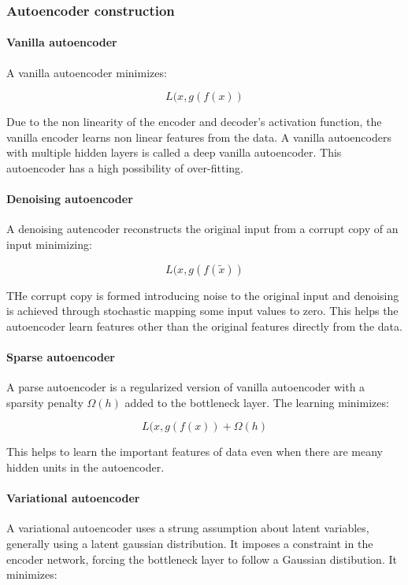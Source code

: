 		\subsubsection{Autoencoder construction}

			\paragraph{Vanilla autoencoder}
			A vanilla autoencoder minimizes:

			$$L(x, g(f(x))$$

			Due to the non linearity of the encoder and decoder's activation function, the vanilla encoder learns non linear features from the data.
			A vanilla autoencoders with multiple hidden layers is called a deep vanilla autoencoder.
			This autoencoder has a high possibility of over-fitting.

			\paragraph{Denoising autoencoder}
			A denoising autencoder reconstructs the original input from a corrupt copy of an input minimizing:

			$$L(x, g(f(\tilde{x}))$$

			THe corrupt copy is formed introducing noise to the original input and denoising is achieved through stochastic mapping some input values to zero.
			This helps the autoencoder learn features other than the original features directly from the data.

			\paragraph{Sparse autoencoder}
			A parse autoencoder is a regularized version of vanilla autoencoder with a sparsity penalty $\Omega(h)$ added to the bottleneck layer.
			The learning minimizes:

			$$L(x, g(f(x))+\Omega(h)$$

			This helps to learn the important features of data even when there are meany hidden units in the autoencoder.

			\paragraph{Variational autoencoder}
			A variational autoencoder uses a strung assumption about latent variables, generally using a latent gaussian distribution.
			It imposes a constraint in the encoder network, forcing the bottleneck layer to follow a Gaussian distibution.
			It minimizes:


